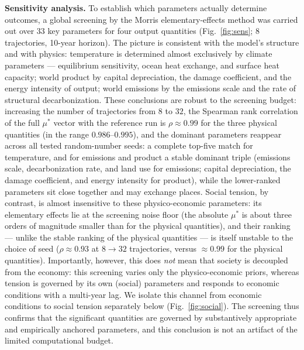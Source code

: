 \documentclass[11pt,a4paper]{article}
\begin{document}
\textbf{Sensitivity analysis.} To establish which parameters actually determine outcomes, a global
screening by the Morris elementary-effects method \citep{morris1991,campolongo2007} was carried out
over 33 key parameters for four output quantities (Fig.~\ref{fig:sens}; $8$ trajectories, 10-year
horizon). The picture is consistent with the model's structure and with physics: temperature is
determined almost exclusively by climate parameters --- equilibrium sensitivity, ocean heat
exchange, and surface heat capacity; world product by capital depreciation, the damage coefficient,
and the energy intensity of output; world emissions by the emissions scale and the rate of
structural decarbonization. These conclusions are robust to the screening budget: increasing the
number of trajectories from $8$ to $32$, the Spearman rank correlation of the full $\mu^*$ vector
with the reference run is $\rho\approx0.99$ for the three physical quantities (in the range
$0.986$--$0.995$), and the dominant parameters reappear across all tested random-number seeds: a
complete top-five match for temperature, and for emissions and product a stable dominant triple
(emissions scale, decarbonization rate, and land use for emissions; capital depreciation, the damage
coefficient, and energy intensity for product), while the lower-ranked parameters sit close together
and may exchange places. Social tension, by contrast, is almost insensitive to these physico-economic
parameters: its elementary effects lie at the screening noise floor (the absolute $\mu^*$ is about
three orders of magnitude smaller than for the physical quantities), and their ranking --- unlike the
stable ranking of the physical quantities --- is itself unstable to the choice of seed
($\rho\approx0.93$ at $8\!\to\!32$ trajectories, versus $\approx0.99$ for the physical quantities). Importantly,
however, this does \emph{not} mean that society is decoupled from the economy: this screening varies
only the physico-economic priors, whereas tension is governed by its own (social) parameters and
responds to economic conditions with a multi-year lag. We isolate this channel from economic
conditions to social tension separately below (Fig.~\ref{fig:social}). The screening thus confirms
that the significant quantities are governed by substantively appropriate and empirically anchored
parameters, and this conclusion is not an artifact of the limited computational budget.
\end{document}
